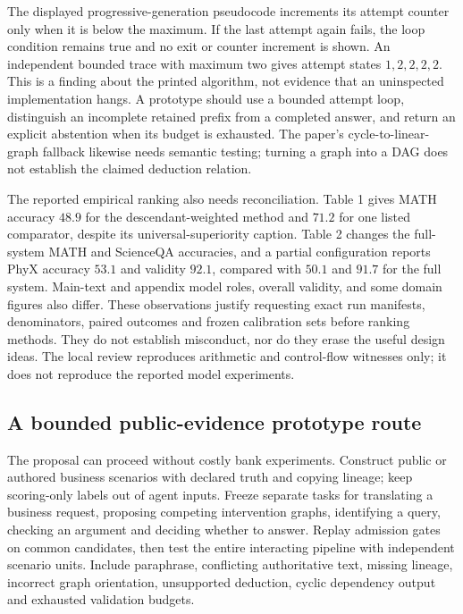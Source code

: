 The displayed progressive-generation pseudocode increments its attempt
counter only when it is below the maximum. If the last attempt again fails,
the loop condition remains true and no exit or counter increment is shown.
An independent bounded trace with maximum two gives attempt states
$1,2,2,2,2$. This is a finding about the printed algorithm, not evidence that
an uninspected implementation hangs. A prototype should use a bounded
attempt loop, distinguish an incomplete retained prefix from a completed
answer, and return an explicit abstention when its budget is exhausted.
The paper's cycle-to-linear-graph fallback likewise needs semantic testing;
turning a graph into a DAG does not establish the claimed deduction relation.

The reported empirical ranking also needs reconciliation. Table 1 gives
MATH accuracy $48.9$ for the descendant-weighted method and $71.2$ for one
listed comparator, despite its universal-superiority caption. Table 2 changes
the full-system MATH and ScienceQA accuracies, and a partial configuration
reports PhyX accuracy $53.1$ and validity $92.1$, compared with $50.1$ and
$91.7$ for the full system. Main-text and appendix model roles, overall
validity, and some domain figures also differ. These observations justify
requesting exact run manifests, denominators, paired outcomes and frozen
calibration sets before ranking methods. They do not establish misconduct,
nor do they erase the useful design ideas. The local review reproduces
arithmetic and control-flow witnesses only; it does not reproduce the
reported model experiments\citep{exec23_scientific_conformal,exec23_admission_conformal_reference}.

\subsection{A bounded public-evidence prototype route}
\label{exec23:admit-route}
The proposal can proceed without costly bank experiments. Construct public
or authored business scenarios with declared truth and copying lineage; keep
scoring-only labels out of agent inputs. Freeze separate tasks for translating
a business request, proposing competing intervention graphs, identifying a
query, checking an argument and deciding whether to answer. Replay admission
gates on common candidates, then test the entire interacting pipeline with
independent scenario units. Include paraphrase, conflicting authoritative
text, missing lineage, incorrect graph orientation, unsupported deduction,
cyclic dependency output and exhausted validation budgets.

